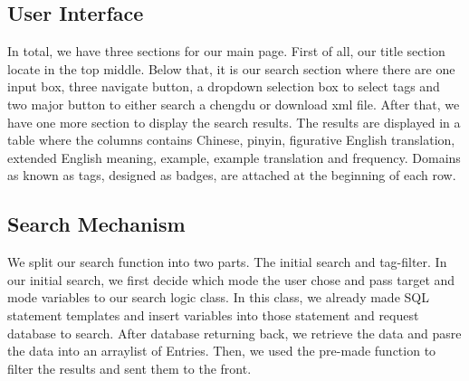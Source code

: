 \documentclass[11pt]{article} %
\begin{document}
\subsection{User Interface}
\indent In total, we have three sections for our main page. First of all, our title section locate in the top middle. Below that, it is our search section where there are one input box, three navigate button, a dropdown selection box to select tags and two major button to either search a chengdu or download xml file. After that, we have one more section to display the search results. The results are displayed in a table where the columns contains Chinese, pinyin, figurative English translation, extended English meaning, example, example translation and frequency. Domains as known as tags, designed as badges, are attached at the beginning of each row.

\subsection{Search Mechanism}
\indent We split our search function into two parts. The initial search and tag-filter. In our initial search, we first decide which mode the user chose and pass target and mode variables to our search logic class. In this class, we already made SQL statement templates and insert variables into those statement and request database to search. After database returning back, we retrieve the data and pasre the data into an arraylist of Entries. Then, we used the pre-made function to filter the results and sent them to the front.



\end{document}
